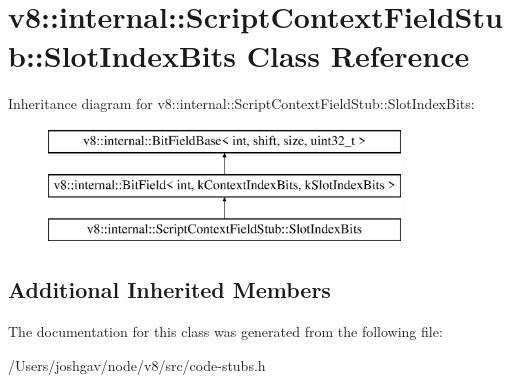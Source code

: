 \hypertarget{classv8_1_1internal_1_1_script_context_field_stub_1_1_slot_index_bits}{}\section{v8\+:\+:internal\+:\+:Script\+Context\+Field\+Stub\+:\+:Slot\+Index\+Bits Class Reference}
\label{classv8_1_1internal_1_1_script_context_field_stub_1_1_slot_index_bits}
Inheritance diagram for v8\+:\+:internal\+:\+:Script\+Context\+Field\+Stub\+:\+:Slot\+Index\+Bits\+:\begin{figure}[H]
\begin{center}
\leavevmode
\includegraphics[height=3.000000cm]{classv8_1_1internal_1_1_script_context_field_stub_1_1_slot_index_bits}
\end{center}
\end{figure}
\subsection*{Additional Inherited Members}


The documentation for this class was generated from the following file\+:\begin{DoxyCompactItemize}
\item 
/\+Users/joshgav/node/v8/src/code-\/stubs.\+h\end{DoxyCompactItemize}
